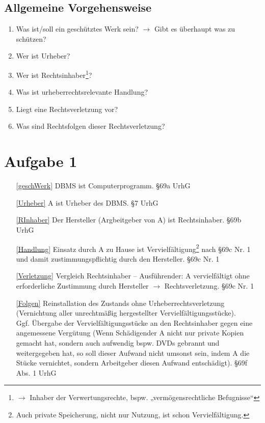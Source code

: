 \documentclass{scrreprt}
\begin{document}
\section{Allgemeine Vorgehensweise}
\begin{enumerate}[label=\arabic*.]
\item \label{geschWerk} Was ist/soll ein geschütztes Werk sein? $\to$ Gibt es überhaupt was zu schützen?
\item \label{Urheber} Wer ist Urheber?
\item \label{RInhaber} Wer ist Rechtsinhaber\footnote{$\to$ Inhaber der Verwertungsrechte, bspw. „vermögensrechtliche Befugnisse“}?
\item \label{Handlung} Was ist urheberrechtsrelevante Handlung?
\item \label{Verletzung} Liegt eine Rechtsverletzung vor?
\item \label{Folgen} Was sind Rechtsfolgen dieser Rechtsverletzung?
\end{enumerate}



\chapter{Aufgabe 1}
\begin{enumerate}
\item[\ref{geschWerk}] DBMS ist Computerprogramm. \hfill §69a UrhG
\item[\ref{Urheber}] A ist Urheber des DBMS. \hfill §7 UrhG
\item[\ref{RInhaber}] Der Hersteller (Argbeitgeber von A) ist Rechtsinhaber. \hfill §69b UrhG
\item[\ref{Handlung}] Einsatz durch A zu Hause ist Vervielfältigung\footnote{Auch private Speicherung, nicht nur Nutzung, ist schon Vervielfältigung.} nach §69c Nr. 1 und damit zustimmungspflichtig durch den Hersteller. \hfill §69c Nr. 1
\item[\ref{Verletzung}] Vergleich Rechtsinhaber -- Ausführender: A vervielfältigt ohne erforderliche Zustimmung durch Hersteller $\to$ Rechtsverletzung. \hfill §69c Nr. 1
\item[\ref{Folgen}] Reinstallation des Zustands ohne Urheberrechtsverletzung (Vernichtung aller unrechtmäßig hergestellter Vervielfältigungsstücke).\\
Ggf. Übergabe der Vervielfältigungsstücke an den Rechtsinhaber gegen eine angemessene Vergütung (Wenn Schädigender A nicht nur private Kopien gemacht hat, sondern auch aufwendig bspw. DVDs gebrannt und weitergegeben hat, so soll dieser Aufwand nicht umsonst sein, indem A die Stücke vernichtet, sondern Arbeitgeber diesen Aufwand entschädigt). \hfill §69f Abs. 1 UrhG
\end{enumerate}
\end{document}
